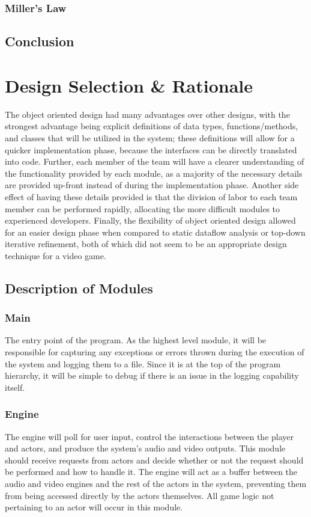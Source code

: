 \documentclass{article}
\begin{document}
		\subsubsection{Miller's Law}
			
	\subsection{Conclusion}
%
%
\section{Design Selection \& Rationale}
The object oriented design had many advantages over other designs, with the strongest advantage being explicit definitions of data types, functions/methods, and classes that will be utilized in the system; these definitions will allow for a quicker implementation phase, because the interfaces can be directly translated into code. Further, each member of the team will have a clearer understanding of the functionality provided by each module, as a majority of the necessary details are provided up-front instead of during the implementation phase. Another side effect of having these details provided is that the division of labor to each team member can be performed rapidly, allocating the more difficult modules to experienced developers. Finally, the flexibility of object oriented design allowed for an easier design phase when compared to static dataflow analysis or top-down iterative refinement, both of which did not seem to be an appropriate design technique for a video game.

  \subsection{Description of Modules}
    \subsubsection{Main}
      The entry point of the program. As the highest level module, it will be responsible for capturing any exceptions or errors thrown during the execution of the system and logging them to a file. Since it is at the top of the program hierarchy, it will be simple to debug if there is an issue in the logging capability itself.
    \subsubsection{Engine}
      The engine will poll for user input, control the interactions between the player and actors, and produce the system's audio and video outputs. This module should receive requests from actors and decide whether or not the request should be performed and how to handle it. The engine will act as a buffer between the audio and video engines and the rest of the actors in the system, preventing them from being accessed directly by the actors themselves. All game logic not pertaining to an actor will occur in this module.
\end{document}
